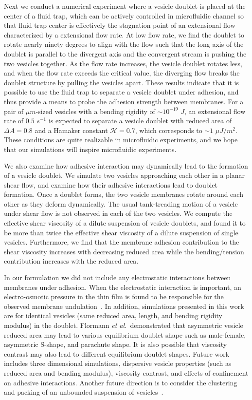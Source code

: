 \documentclass[prf,superscriptaddress,showkeys]{revtex4-1}
\begin{document}
Next we conduct a numerical experiment where a vesicle doublet is placed
at the center of a fluid trap, which can be actively controlled in
microfluidic channel so that fluid trap center is effectively the
stagnation point of an extensional flow characterized by a extensional
flow rate.  At low flow rate, we find the doublet to rotate nearly
ninety degrees to align with the flow such that the long axis of the
doublet is parallel to the divergent axis and the convergent stream is
pushing the two vesicles together. As the flow rate increases, the
vesicle doublet rotates less, and when the flow rate exceeds the
critical value, the diverging flow breaks the doublet structure by
pulling the vesicles apart.  These results indicate that it is possible
to use the fluid trap to separate a vesicle doublet under adhesion, and
thus provide a means to probe the adhesion strength between membranes.
For a pair of $\mu m$-sized vesicles with a bending rigidity of $\sim
10^{-19}$ $J$, an extensional flow rate of $0.5$ $s^{-1}$ is expected to
separate a vesicle doublet with reduced area of $\Delta A = 0.8$ and a
Hamaker constant $\mathcal{H}=0.7$, which corresponds to $\sim 1$ $\mu
J/m^2$.  These conditions are quite realizable in microfluidic
experiments, and we hope that our simulations will inspire microfluidic
experiments.

We also examine how adhesive interaction may dynamically lead to the
formation of a vesicle doublet.  We simulate two vesicles approaching
each other in a planar shear flow, and examine how their adhesive
interactions lead to doublet formation.  Once a doublet forms, the two
vesicle membranes rotate around each other as they deform dynamically.
The usual tank-treading motion of a vesicle under shear flow is not
observed in each of the two vesicles. We compute the effective shear
viscosity of a dilute suspension of vesicle doublets, and found it to be
more than twice the effective shear viscosity of a dilute suspension of
single vesicles.  Furthermore, we find that the membrane adhesion
contribution to the shear viscosity increases with decreasing reduced
area while the bending/tension contribution increases with the reduced
area.

In our formulation we did not include any electrostatic interactions
between membranes under adhesion. When the electrostatic interaction is
important, an electro-osmotic pressure in the thin film is found to be
responsible for the observed membrane
undulation~\cite{SteinkuhlerAgudo-Canalejo2016_BJ}.  In addition,
simulations presented in this work are for identical vesicles (same
reduced area, length, and bending rigidity modulus) in the doublet.
Flormann {\em et al.}~demonstrated that asymmetric vesicle reduced area
may lead to various equilibrium doublet shape such as male-female,
asymmetric S-shape, and parachute shape.  It is also possible that
viscosity contrast may also lead to different equilibrium doublet
shapes.  Future work includes three dimensional simulations, dispersive
vesicle properties (such as reduced area and bending modulus), viscosity
contrast, and effects of confinement on adhesive interactions.  Another
future direction is to consider the clustering and packing of an
unbounded suspension of vesicles~\cite{FlormannAouane2017_SciReports}.
\end{document}
